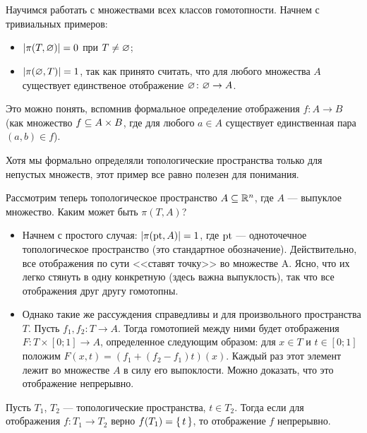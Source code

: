\documentclass[main]{subfiles}
\begin{document}
\resetcounters

\section{}

Научимся работать с множествами всех классов гомотопности. Начнем с тривиальных примеров:
\begin{itemize}
	\item $ \left\vert\pi(T, \varnothing)\right\vert = 0 $ при $ T \neq \varnothing $;
	\item $ \left\vert\pi(\varnothing, T)\right\vert = 1 $, так как принято считать, что для любого множества $ A $ существует
		единственое отображение $ \varnothing \colon \varnothing \to A $.
\end{itemize}
Это можно понять, вспомнив формальное определение отображения $ f \colon A \to B $
(как множество $ f \subseteq A \times B $, где для любого $ a \in A $ существует единственная пара $ (a, b) \in f $).

\begin{remark}
	Хотя мы формально определяли топологические пространства только для непустых множеств, этот пример все равно
	полезен для понимания.
\end{remark}

Рассмотрим теперь топологическое пространство $ A \subseteq \mathbb{R}^n $, где $ A $ --- выпуклое множество.
Каким может быть $ \pi(T, A) $?
\begin{itemize}
	\item Начнем с простого случая: $ \left\vert\pi(\operatorname{pt}, A)\right\vert = 1 $, где $ \operatorname{pt} $ --- одноточечное топологическое пространство
		(это стандартное обозначение). Действительно, все отображения по сути <<ставят точку>>
		во множестве A. Ясно, что их легко стянуть в одну конкретную (здесь важна выпуклость), так что все отображения
		друг другу гомотопны.
	\item Однако такие же рассуждения справедливы и для произвольного пространства $ T $. Пусть
		$ f_1, f_2 \colon T \to A $. Тогда гомотопией между ними будет отображения
		$ F \colon T \times [0; 1] \to A $, определенное следующим образом: для $ x \in T $ и
		$ t \in [0; 1] $ положим $ F(x, t) = (f_1 + (f_2 - f_1) t)(x) $. Каждый раз этот элемент лежит
		во множестве $ A $ в силу его выпоклости. Можно доказать, что это отображение непрерывно.
\end{itemize}

\begin{theorem}
	Пусть $ T_1 $, $ T_2 $ --- топологические пространства, $ t \in T_2 $. Тогда если для отображения
	$ f \colon T_1 \to T_2 $ верно $ f(T_1) = \left\{\,t\,\right\} $, то отображение $ f $ непрерывно.
\end{theorem}
\end{document}
